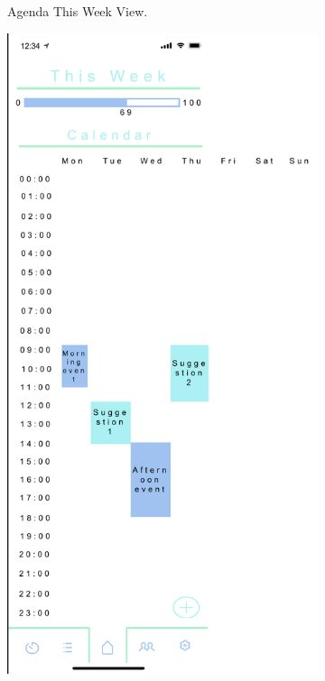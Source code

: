 \begin{figure}[H]
\begin{subfigure}[b]{0.3\textwidth}
        \caption{Agenda This Week View.}
        \label{fig:agenda_this_week_colour}
    \end{subfigure}
    \hfill
    \begin{subfigure}[b]{0.3\textwidth}
        \centering
        \includegraphics[width=\textwidth]{./graphics/design/Dashboard - Calendar View - This Week.png}

\end{subfigure}
\end{figure}
